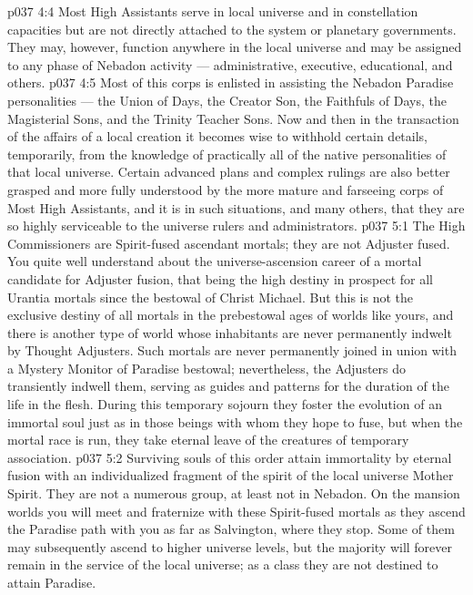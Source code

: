 \vs p037 4:4 Most High Assistants serve in local universe and in constellation capacities but are not directly attached to the system or planetary governments. They may, however, function anywhere in the local universe and may be assigned to any phase of Nebadon activity --- administrative, executive, educational, and others.
\vs p037 4:5 Most of this corps is enlisted in assisting the Nebadon Paradise personalities --- the Union of Days, the Creator Son, the Faithfuls of Days, the Magisterial Sons, and the Trinity Teacher Sons. Now and then in the transaction of the affairs of a local creation it becomes wise to withhold certain details, temporarily, from the knowledge of practically all of the native personalities of that local universe. Certain advanced plans and complex rulings are also better grasped and more fully understood by the more mature and farseeing corps of Most High Assistants, and it is in such situations, and many others, that they are so highly serviceable to the universe rulers and administrators.
\vs p037 5:1 The High Commissioners are Spirit\hyp{}fused ascendant mortals; they are not Adjuster fused. You quite well understand about the universe\hyp{}ascension career of a mortal candidate for Adjuster fusion, that being the high destiny in prospect for all Urantia mortals since the bestowal of Christ Michael. But this is not the exclusive destiny of all mortals in the prebestowal ages of worlds like yours, and there is another type of world whose inhabitants are never permanently indwelt by Thought Adjusters. Such mortals are never permanently joined in union with a Mystery Monitor of Paradise bestowal; nevertheless, the Adjusters do transiently indwell them, serving as guides and patterns for the duration of the life in the flesh. During this temporary sojourn they foster the evolution of an immortal soul just as in those beings with whom they hope to fuse, but when the mortal race is run, they take eternal leave of the creatures of temporary association.
\vs p037 5:2 Surviving souls of this order attain immortality by eternal fusion with an individualized fragment of the spirit of the local universe Mother Spirit. They are not a numerous group, at least not in Nebadon. On the mansion worlds you will meet and fraternize with these Spirit\hyp{}fused mortals as they ascend the Paradise path with you as far as Salvington, where they stop. Some of them may subsequently ascend to higher universe levels, but the majority will forever remain in the service of the local universe; as a class they are not destined to attain Paradise.
